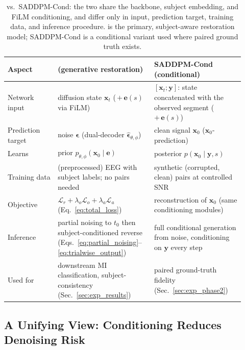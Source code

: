 \begin{table}[t]
  \caption{\saddpm{} vs.\ \mbox{SADDPM-Cond}: the two share the backbone, subject
  embedding, and FiLM conditioning, and differ only in input, prediction target,
  training data, and inference procedure. \saddpm{} is the primary,
  subject-aware restoration model; \mbox{SADDPM-Cond} is a conditional variant used
  where paired ground truth exists.}
  \label{tab:variant}
  \small
  \setlength{\tabcolsep}{4pt}
  \begin{tabular}{p{0.20\linewidth} p{0.36\linewidth} p{0.36\linewidth}}
    \toprule
    Aspect & \saddpm{} (generative restoration) & \mbox{SADDPM-Cond} (conditional) \\
    \midrule
    Network input & diffusion state $\mathbf{x}_t$ (\,$+\,\mathbf{e}(s)$ via FiLM) & $[\mathbf{x}_t;\mathbf{y}]$: state concatenated with the observed segment (\,$+\,\mathbf{e}(s)$) \\
    Prediction target & noise $\boldsymbol{\epsilon}$ (dual-decoder $\widehat{\boldsymbol{\epsilon}}_{\theta,\phi}$) & clean signal $\mathbf{x}_0$ ($\mathbf{x}_0$-prediction) \\
    Learns & prior $p_{\theta,\phi}(\mathbf{x}_0\mid\mathbf{e})$ & posterior $p(\mathbf{x}_0\mid\mathbf{y},s)$ \\
    Training data & (preprocessed) EEG with subject labels; no pairs needed & synthetic (corrupted, clean) pairs at controlled SNR \\
    Objective & $\mathcal{L}_r+\lambda_o\mathcal{L}_o+\lambda_a\mathcal{L}_a$ (Eq.~\eqref{eq:total_loss}) & reconstruction of $\mathbf{x}_0$ (same conditioning modules) \\
    Inference & partial noising to $t_0$ then subject-conditioned reverse (Eqs.~\eqref{eq:partial_noising}--\eqref{eq:trialwise_output}) & full conditional generation from noise, conditioning on $\mathbf{y}$ every step \\
    Used for & downstream MI classification, subject-consistency (Sec.~\ref{sec:exp_results}) & paired ground-truth fidelity (Sec.~\ref{sec:exp_phase2}) \\
    \bottomrule
  \end{tabular}
\end{table}

\subsection{A Unifying View: Conditioning Reduces Denoising Risk}
\label{sec:method_unify}

